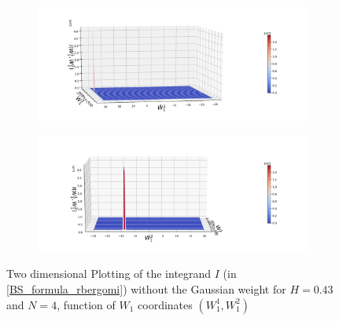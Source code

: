 \documentclass[11pt]{article}
\begin{document}
\begin{figure}[h!]
	\centering
	\begin{subfigure}{.4\textwidth}
		\centering
		\includegraphics[width=1\linewidth]{./figures/integrand_plotting_rBergomi/2D_plots/N_4/integrand_without_density/H_043/Bergomi_integrand_contours_K_1_H_043_W1_1_2_N_4_without_weights_2_80}
		\caption{}
		\label{fig:sub3}
	\end{subfigure}%
	\begin{subfigure}{.4\textwidth}
		\centering
		\includegraphics[width=1\linewidth]{./figures/integrand_plotting_rBergomi/2D_plots/N_4/integrand_without_density/H_043/Bergomi_integrand_contours_K_1_H_043_W1_1_2_N_4_without_weights_2_0}
		\caption{}
		\label{fig:sub4}
	\end{subfigure}
	
	
	
	\caption{Two dimensional Plotting of the integrand $I$ (in \eqref{BS_formula_rbergomi}) without the Gaussian weight  for $H=0.43$ and $N=4$, function of $W_1$ coordinates $(W_1^1,W^2_1)$}
	\label{fig:Two dimensional Plotting of the integrand $I$_W12_view_set1}
\end{figure}

\FloatBarrier
\end{document}

